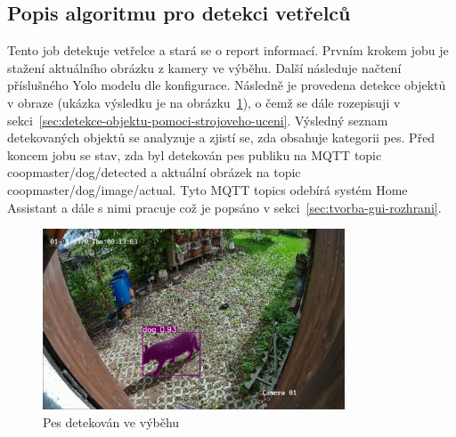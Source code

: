 \subsection*{Popis algoritmu pro detekci vetřelců}
Tento job detekuje vetřelce a stará se o report informací.
Prvním krokem jobu je stažení aktuálního obrázku z kamery ve výběhu.
Další následuje načtení příslušného Yolo modelu dle konfigurace.
Následně je provedena detekce objektů v obraze (ukázka výsledku je na obrázku~\ref{fig:dog_detected}), o čemž se dále rozepisuji v sekci~\ref{sec:detekce-objektu-pomoci-strojoveho-uceni}.
Výsledný seznam detekovaných objektů se analyzuje a zjistí se, zda obsahuje kategorii pes.
Před koncem jobu se stav, zda byl detekován pes publiku na MQTT topic coopmaster/dog/detected a aktuální obrázek na topic coopmaster/dog/image/actual.
Tyto MQTT topics odebírá systém Home Assistant a dále s nimi pracuje což je popsáno v sekci~\ref{sec:tvorba-gui-rozhrani}.

\begin{figure}[H]
    \centering
    \includegraphics[width=0.8\textwidth]{img/dog_detected}
    \caption{Pes detekován ve výběhu}
    \label{fig:dog_detected}
\end{figure}



